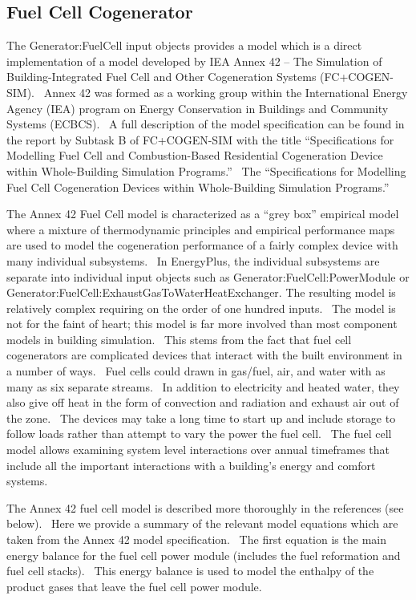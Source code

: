 \subsection{Fuel Cell Cogenerator}\label{fuel-cell-cogenerator}

The Generator:FuelCell input objects provides a model which is a direct implementation of a model developed by IEA Annex 42 -- The Simulation of Building-Integrated Fuel Cell and Other Cogeneration Systems (FC+COGEN-SIM).~ Annex 42 was formed as a working group within the International Energy Agency (IEA) program on Energy Conservation in Buildings and Community Systems (ECBCS).~ A full description of the model specification can be found in the report by Subtask B of FC+COGEN-SIM with the title ``Specifications for Modelling Fuel Cell and Combustion-Based Residential Cogeneration Device within Whole-Building Simulation Programs.''~ The ``Specifications for Modelling Fuel Cell Cogeneration Devices within Whole-Building Simulation Programs.''

The Annex 42 Fuel Cell model is characterized as a ``grey box'' empirical model where a mixture of thermodynamic principles and empirical performance maps are used to model the cogeneration performance of a fairly complex device with many individual subsystems.~ In EnergyPlus, the individual subsystems are separate into individual input objects such as Generator:FuelCell:PowerModule or Generator:FuelCell:ExhaustGasToWaterHeatExchanger. The resulting model is relatively complex requiring on the order of one hundred inputs.~ The model is not for the faint of heart; this model is far more involved than most component models in building simulation.~ This stems from the fact that fuel cell cogenerators are complicated devices that interact with the built environment in a number of ways.~ Fuel cells could drawn in gas/fuel, air, and water with as many as six separate streams.~ In addition to electricity and heated water, they also give off heat in the form of convection and radiation and exhaust air out of the zone.~ The devices may take a long time to start up and include storage to follow loads rather than attempt to vary the power the fuel cell.~ The fuel cell model allows examining system level interactions over annual timeframes that include all the important interactions with a building's energy and comfort systems.

The Annex 42 fuel cell model is described more thoroughly in the references (see below).~ Here we provide a summary of the relevant model equations which are taken from the Annex 42 model specification.~ The first equation is the main energy balance for the fuel cell power module (includes the fuel reformation and fuel cell stacks).~ This energy balance is used to model the enthalpy of the product gases that leave the fuel cell power module.

